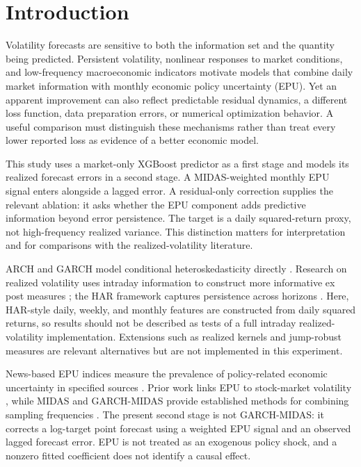 \section{Introduction}
\label{sec:introduction}
Volatility forecasts are sensitive to both the information set and the quantity being predicted. Persistent volatility, nonlinear responses to market conditions, and low-frequency macroeconomic indicators motivate models that combine daily market information with monthly economic policy uncertainty (EPU). Yet an apparent improvement can also reflect predictable residual dynamics, a different loss function, data preparation errors, or numerical optimization behavior. A useful comparison must distinguish these mechanisms rather than treat every lower reported loss as evidence of a better economic model.

This study uses a market-only XGBoost predictor as a first stage and models its realized forecast errors in a second stage. A MIDAS-weighted monthly EPU signal enters alongside a lagged error. A residual-only correction supplies the relevant ablation: it asks whether the EPU component adds predictive information beyond error persistence. The target is a daily squared-return proxy, not high-frequency realized variance. This distinction matters for interpretation and for comparisons with the realized-volatility literature.

ARCH and GARCH model conditional heteroskedasticity directly \citep{Engle1982,Bollerslev1986}. Research on realized volatility uses intraday information to construct more informative ex post measures \citep{AndersenBollerslevDieboldLabys2003}; the HAR framework captures persistence across horizons \citep{Corsi2009}. Here, HAR-style daily, weekly, and monthly features are constructed from daily squared returns, so results should not be described as tests of a full intraday realized-volatility implementation. Extensions such as realized kernels and jump-robust measures are relevant alternatives but are not implemented in this experiment.

News-based EPU indices measure the prevalence of policy-related economic uncertainty in specified sources \citep{BakerBloomDavis2016,DavisLiuSheng2019}. Prior work links EPU to stock-market volatility \citep{LiuZhang2015}, while MIDAS and GARCH-MIDAS provide established methods for combining sampling frequencies \citep{GhyselsSinkoValkanov2007,EngleGhyselsSohn2013}. The present second stage is not GARCH-MIDAS: it corrects a log-target point forecast using a weighted EPU signal and an observed lagged forecast error. EPU is not treated as an exogenous policy shock, and a nonzero fitted coefficient does not identify a causal effect.

